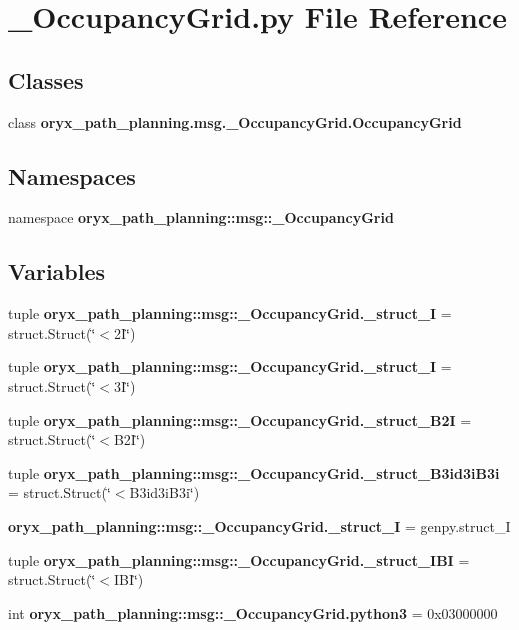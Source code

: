 \section{\-\_\-\-Occupancy\-Grid.\-py \-File \-Reference}
\label{__OccupancyGrid_8py}
\subsection*{\-Classes}
\begin{DoxyCompactItemize}
\item 
class {\bf oryx\-\_\-path\-\_\-planning.\-msg.\-\_\-\-Occupancy\-Grid.\-Occupancy\-Grid}
\end{DoxyCompactItemize}
\subsection*{\-Namespaces}
\begin{DoxyCompactItemize}
\item 
namespace {\bf oryx\-\_\-path\-\_\-planning\-::msg\-::\-\_\-\-Occupancy\-Grid}
\end{DoxyCompactItemize}
\subsection*{\-Variables}
\begin{DoxyCompactItemize}
\item 
tuple {\bf oryx\-\_\-path\-\_\-planning\-::msg\-::\-\_\-\-Occupancy\-Grid.\-\_\-struct\-\_\-I} = struct.\-Struct(\char`\"{}$<$2\-I\char`\"{})
\item 
tuple {\bf oryx\-\_\-path\-\_\-planning\-::msg\-::\-\_\-\-Occupancy\-Grid.\-\_\-struct\-\_\-I} = struct.\-Struct(\char`\"{}$<$3\-I\char`\"{})
\item 
tuple {\bf oryx\-\_\-path\-\_\-planning\-::msg\-::\-\_\-\-Occupancy\-Grid.\-\_\-struct\-\_\-\-B2\-I} = struct.\-Struct(\char`\"{}$<$\-B2\-I\char`\"{})
\item 
tuple {\bf oryx\-\_\-path\-\_\-planning\-::msg\-::\-\_\-\-Occupancy\-Grid.\-\_\-struct\-\_\-\-B3id3i\-B3i} = struct.\-Struct(\char`\"{}$<$\-B3id3i\-B3i\char`\"{})
\item 
{\bf oryx\-\_\-path\-\_\-planning\-::msg\-::\-\_\-\-Occupancy\-Grid.\-\_\-struct\-\_\-\-I} = genpy.\-struct\-\_\-\-I
\item 
tuple {\bf oryx\-\_\-path\-\_\-planning\-::msg\-::\-\_\-\-Occupancy\-Grid.\-\_\-struct\-\_\-\-I\-B\-I} = struct.\-Struct(\char`\"{}$<$\-I\-B\-I\char`\"{})
\item 
int {\bf oryx\-\_\-path\-\_\-planning\-::msg\-::\-\_\-\-Occupancy\-Grid.\-python3} = 0x03000000
\end{DoxyCompactItemize}
